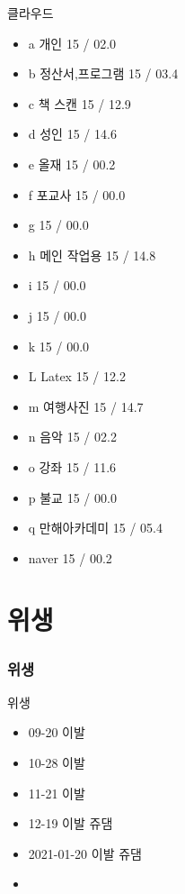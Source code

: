 \documentclass[aspectratio=1610,20pt,xcolor=pdftex,dvipsnames,table,handout]{beamer}
\begin{document}
		\begin{frame} [t,plain]
			\begin{block} {클라우드}
			\setlength{\leftmargini}{2em}			
			\begin{itemize}
				\item a 개인				\hfill 	15 / 02.0
				\item b 정산서,프로그램	\hfill 	15 / 03.4
				\item c 책 스캔			\hfill 	15 /	12.9
				\item d 성인				\hfill 	15 / 14.6
				\item e 올재				\hfill 	15 / 00.2
				\item f 포교사			\hfill 	15 / 00.0
				\item g 					\hfill 	15 / 00.0

				\item h 메인 작업용 		\hfill 	15 / 14.8
				\item i 					\hfill 	15 / 00.0
				\item j 					\hfill 	15 / 00.0
				\item k 					\hfill 	15 / 00.0

				\item L Latex 			\hfill 	15 / 12.2
				\item m 여행사진 		\hfill 	15 / 14.7
				\item n 음악 			\hfill 	15 / 02.2
				\item o 강좌				\hfill 	15 / 11.6
				\item p 불교				\hfill 	15 / 00.0
				\item q 만해아카데미		\hfill 	15 / 05.4 \\ 
				\hrulefill

				\item naver				\hfill 	15 / 00.2	
			\end{itemize}
			\end{block}						


		\end{frame}						

		\section{위생 }
		\begin{frame} [t,plain]
		\frametitle{위생 }
			\begin{block} {위생 }
			\setlength{\leftmargini}{2em}			
			\begin{itemize}
				\item 09-20 이발 
				\item 10-28 이발 
				\item 11-21 이발 
				\item 12-19 이발  쥬댐 
				\item  2021-01-20 이발 쥬댐
				\item 
			\end{itemize}
			\end{block}						
		\end{frame}						
\end{document}
